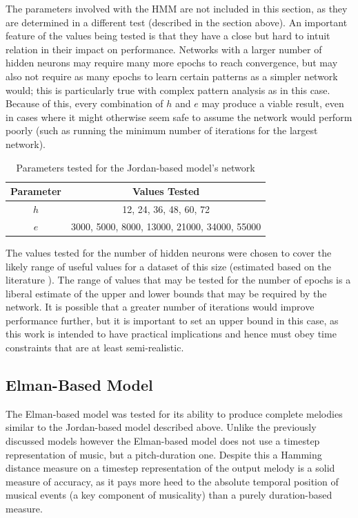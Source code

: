 \documentclass[ author={Stephen Livermore-Tozer},
				supervisor={Dr. Peter Flach},
				degree={MEng},
				title={Algorithmic Co-composition Using Machine Learning},
				subtitle={},
				type={research},
				year={2016} ]{dissertation}
\begin{document}
	The parameters involved with the HMM are not included in this section, as they are determined in a different test (described in the section above). An important feature of the values being tested is that they have a close but hard to intuit relation in their impact on performance. Networks with a larger number of hidden neurons may require many more epochs to reach convergence, but may also not require as many epochs to learn certain patterns as a simpler network would; this is particularly true with complex pattern analysis as in this case. Because of this, every combination of $h$ and $e$ may produce a viable result, even in cases where it might otherwise seem safe to assume the network would perform poorly (such as running the minimum number of iterations for the largest network).
	
	\begin{table}[h]
		\begin{center}
			\begin{tabular}{cc}
				\toprule
				Parameter & Values Tested\\
				\hline
				$h$ & 12, 24, 36, 48, 60, 72\\
				$e$ & 3000, 5000, 8000, 13000, 21000, 34000, 55000\\
				\bottomrule
			\end{tabular}
		\end{center}
		\caption{Parameters tested for the Jordan-based model's network}
		\label{tab:jordan-net-parameters}
	\end{table}
	
	The values tested for the number of hidden neurons were chosen to cover the likely range of useful values for a dataset of this size (estimated based on the literature \cite{todd1989connectionist}). The range of values that may be tested for the number of epochs is a liberal estimate of the upper and lower bounds that may be required by the network. It is possible that a greater number of iterations would improve performance further, but it is important to set an upper bound in this case, as this work is intended to have practical implications and hence must obey time constraints that are at least semi-realistic.
	
	\subsection{Elman-Based Model}
	
	The Elman-based model was tested for its ability to produce complete melodies similar to the Jordan-based model described above. Unlike the previously discussed models however the Elman-based model does not use a timestep representation of music, but a pitch-duration one. Despite this a Hamming distance measure on a timestep representation of the output melody is a solid measure of accuracy, as it pays more heed to the absolute temporal position of musical events (a key component of musicality) than a purely duration-based measure.
	
\end{document}
